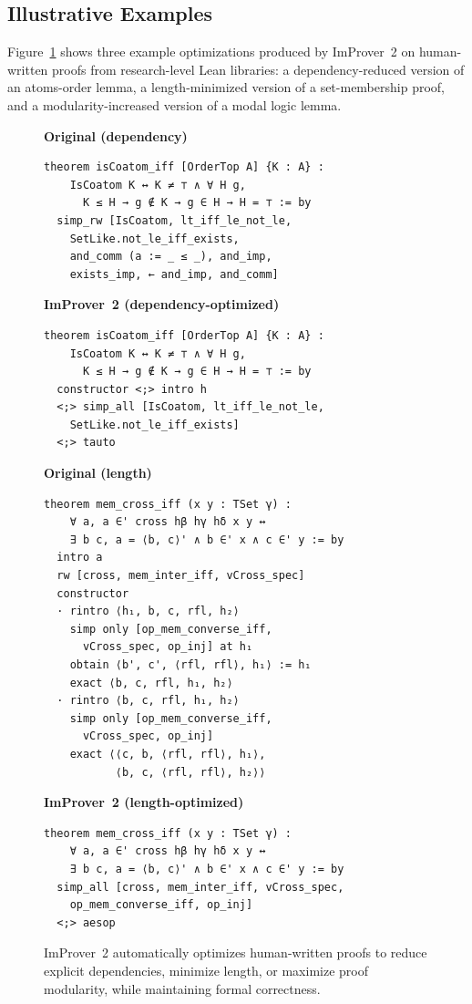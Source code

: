 \subsection{Illustrative Examples}

Figure~\ref{fig:main-demo} shows three example optimizations produced by ImProver~2 on human-written proofs from research-level Lean libraries: a dependency-reduced version of an atoms-order lemma, a length-minimized version of a set-membership proof, and a modularity-increased version of a modal logic lemma.

\begin{figure}[tbp]
\begin{minipage}[t]{0.49\textwidth}
\textbf{Original (dependency)}
\begin{lstlisting}[basicstyle=\tiny\ttfamily]
theorem isCoatom_iff [OrderTop A] {K : A} :
    IsCoatom K ↔ K ≠ ⊤ ∧ ∀ H g,
      K ≤ H → g ∉ K → g ∈ H → H = ⊤ := by
  simp_rw [IsCoatom, lt_iff_le_not_le,
    SetLike.not_le_iff_exists,
    and_comm (a := _ ≤ _), and_imp,
    exists_imp, ← and_imp, and_comm]
\end{lstlisting}
\textbf{ImProver~2 (dependency-optimized)}
\begin{lstlisting}[basicstyle=\tiny\ttfamily]
theorem isCoatom_iff [OrderTop A] {K : A} :
    IsCoatom K ↔ K ≠ ⊤ ∧ ∀ H g,
      K ≤ H → g ∉ K → g ∈ H → H = ⊤ := by
  constructor <;> intro h
  <;> simp_all [IsCoatom, lt_iff_le_not_le,
    SetLike.not_le_iff_exists]
  <;> tauto
\end{lstlisting}
\end{minipage}\hfill
\begin{minipage}[t]{0.49\textwidth}
\textbf{Original (length)}
\begin{lstlisting}[basicstyle=\tiny\ttfamily]
theorem mem_cross_iff (x y : TSet γ) :
    ∀ a, a ∈' cross hβ hγ hδ x y ↔
    ∃ b c, a = ⟨b, c⟩' ∧ b ∈' x ∧ c ∈' y := by
  intro a
  rw [cross, mem_inter_iff, vCross_spec]
  constructor
  · rintro ⟨h₁, b, c, rfl, h₂⟩
    simp only [op_mem_converse_iff,
      vCross_spec, op_inj] at h₁
    obtain ⟨b', c', ⟨rfl, rfl⟩, h₁⟩ := h₁
    exact ⟨b, c, rfl, h₁, h₂⟩
  · rintro ⟨b, c, rfl, h₁, h₂⟩
    simp only [op_mem_converse_iff,
      vCross_spec, op_inj]
    exact ⟨⟨c, b, ⟨rfl, rfl⟩, h₁⟩,
           ⟨b, c, ⟨rfl, rfl⟩, h₂⟩⟩
\end{lstlisting}
\textbf{ImProver~2 (length-optimized)}
\begin{lstlisting}[basicstyle=\tiny\ttfamily]
theorem mem_cross_iff (x y : TSet γ) :
    ∀ a, a ∈' cross hβ hγ hδ x y ↔
    ∃ b c, a = ⟨b, c⟩' ∧ b ∈' x ∧ c ∈' y := by
  simp_all [cross, mem_inter_iff, vCross_spec,
    op_mem_converse_iff, op_inj]
  <;> aesop
\end{lstlisting}
\end{minipage}
\caption{ImProver~2 automatically optimizes human-written proofs to reduce explicit dependencies, minimize length, or maximize proof modularity, while maintaining formal correctness.}
\label{fig:main-demo}
\end{figure}
